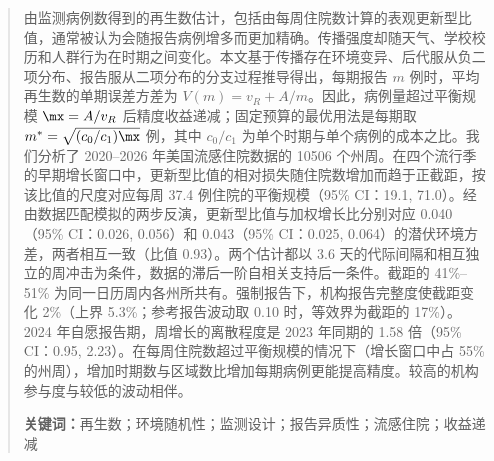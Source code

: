 \begin{abstract}
\noindent 由监测病例数得到的再生数估计，包括由每周住院数计算的表观更新型比值，通常被认为会随报告病例增多而更加精确。传播强度却随天气、学校校历和人群行为在时期之间变化。本文基于传播存在环境变异、后代服从负二项分布、报告服从二项分布的分支过程推导得出，每期报告 $m$ 例时，平均再生数的单期误差方差为 $V(m)=v_R+A/m$。因此，病例量超过平衡规模 $\mx=A/v_R$ 后精度收益递减；固定预算的最优用法是每期取 $m^*=\sqrt{(c_0/c_1)\mx}$ 例，其中 $c_0/c_1$ 为单个时期与单个病例的成本之比。我们分析了 2020--2026 年美国流感住院数据的 10506 个州周。在四个流行季的早期增长窗口中，更新型比值的相对损失随住院数增加而趋于正截距，按该比值的尺度对应每周 37.4 例住院的平衡规模（95\% CI：19.1, 71.0）。经由数据匹配模拟的两步反演，更新型比值与加权增长比分别对应 0.040（95\% CI：0.026, 0.056）和 0.043（95\% CI：0.025, 0.064）的潜伏环境方差，两者相互一致（比值 0.93）。两个估计都以 3.6 天的代际间隔和相互独立的周冲击为条件，数据的滞后一阶自相关支持后一条件。截距的 41\%--51\% 为同一日历周内各州所共有。强制报告下，机构报告完整度使截距变化 2\%（上界 5.3\%；参考报告波动取 0.10 时，等效界为截距的 17\%）。2024 年自愿报告期，周增长的离散程度是 2023 年同期的 1.58 倍（95\% CI：0.95, 2.23）。在每周住院数超过平衡规模的情况下（增长窗口中占 55\% 的州周），增加时期数与区域数比增加每期病例更能提高精度。较高的机构参与度与较低的波动相伴。

\medskip
\noindent\textbf{关键词：}再生数；环境随机性；监测设计；报告异质性；流感住院；收益递减
\end{abstract}
